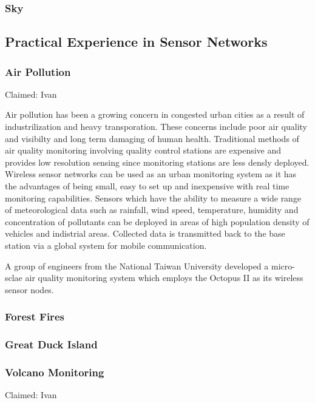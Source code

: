 \subsubsection{Sky}


\subsection{Practical Experience in Sensor Networks}

\subsubsection{Air Pollution}
\cite{libeliumAirPollution}
\cite{wsnpollution} Claimed: Ivan

Air pollution has been a growing concern in congested urban cities as a result of industrilization and heavy transporation. These concerns include poor air quality and visibilty and long term damaging of human health. Traditional methods of air quality monitoring involving quality control stations are expensive and provides low resolution sensing since monitoring stations are less densly deployed. Wireless sensor networks can be used as an urban monitoring system as it has the advantages of being small, easy to set up and inexpensive with real time monitoring capabilities. Sensors which have the ability to measure a wide range of meteorological data such as rainfall, wind speed, temperature, humidity and concentration of pollutants can be deployed in areas of high population density of vehicles and indistrial areas. Collected data is transmitted back to the base station via a global system for mobile communication.

A group of engineers from the National Taiwan University developed a micro-sclae air quality monitoring system which employs the Octopus II as its wireless sensor nodes.

\subsubsection{Forest Fires}
\cite{libeliumForestFires}
\cite{FireWxNet}

\subsubsection{Great Duck Island}
\cite{SzewczykPMC04}

\subsubsection{Volcano Monitoring}
Claimed: Ivan

